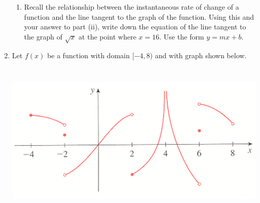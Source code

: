 \documentclass[fleqn,12pt]{article}
\newcommand{\<}{\ensuremath{\langle}}
\renewcommand{\>}{\ensuremath{\rangle}}
\begin{document}
\begin{enumerate}
\begin{enumerate}[{(i)}]
      \item Recall the relationship between the instantaneous rate of change of a
        function and the line tangent to the graph of the function. Using this and your
        answer to part (ii), write down the equation of the line tangent to the graph
        of $\sqrt{x}$ at the point where $x = 16$. Use the form $y = mx + b$.


      \end{enumerate}

      \newpage


    \item Let $f(x)$ be a function with domain $[-4, 8)$ and with graph shown
      below. 

      \begin{center}
        \includegraphics[height=3in]{Problem254}
      \end{center}


\end{enumerate}
\end{document}
